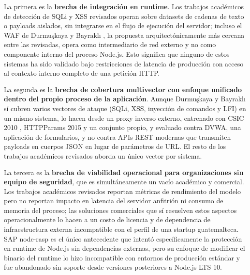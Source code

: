 La primera es la \textbf{brecha de integración en runtime}. Los trabajos académicos de detección de
SQLi y XSS revisados operan sobre datasets de cadenas de texto o payloads aislados, sin
integrarse en el flujo de ejecución del servidor; incluso el WAF de Durmuşkaya y Bayraklı \cite{durmuskaya2025waf}, la propuesta arquitectónicamente
más cercana entre las revisadas, opera como intermediario de red externo y no como componente interno del proceso Node.js. Esto significa que ninguno de estos
sistemas ha sido validado bajo restricciones de latencia de producción con acceso al contexto
interno completo de una petición HTTP.

La segunda es la \textbf{brecha de cobertura multivector con enfoque unificado dentro del propio
proceso de la aplicación}. Aunque Durmuşkaya y Bayraklı \cite{durmuskaya2025waf} sí cubren varios vectores de ataque (SQLi,
XSS, inyección de comandos y LFI) en un mismo sistema, lo hacen desde un proxy inverso externo,
entrenado con CSIC 2010 \cite{torrano2010csic}, HTTPParams 2015 y un conjunto propio, y evaluado contra DVWA, una
aplicación de formularios, y no contra APIs REST modernas que transmiten payloads en cuerpos JSON en
lugar de parámetros de URL. El resto de
los trabajos académicos revisados aborda un único vector por sistema.

La tercera es la \textbf{brecha de viabilidad operacional para organizaciones sin equipo de
seguridad}, que es simultáneamente un vacío académico y comercial. Los trabajos académicos
revisados reportan métricas de rendimiento del modelo pero no reportan impacto en latencia del
servidor anfitrión ni consumo de memoria del proceso; las soluciones comerciales que sí resuelven
estos aspectos operacionalmente lo hacen a un costo de licencia y de dependencia de
infraestructura externa incompatible con el perfil de una startup guatemalteca. SAP node-rasp
\cite{saparchive2019} es el único antecedente que intentó específicamente la protección en
runtime de Node.js sin dependencias externas, pero su enfoque de modificar el binario del runtime
lo hizo incompatible con entornos de producción estándar y fue abandonado sin soporte desde
versiones posteriores a Node.js LTS 10.

